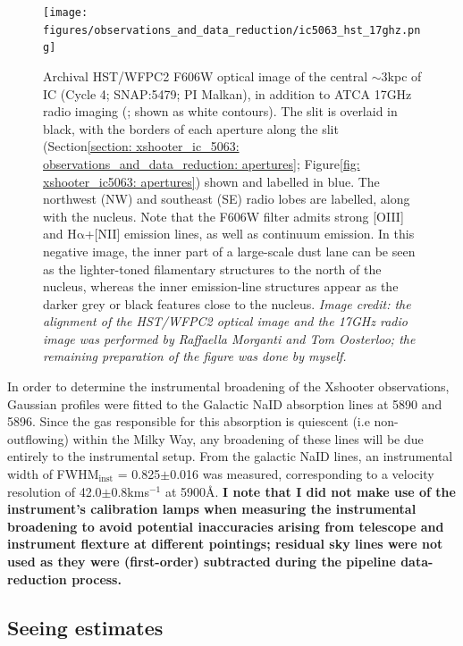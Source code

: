 \begin{figure}
    \texttt{[image: figures/observations\_and\_data\_reduction/ic5063\_hst\_17ghz.png]}
    \caption[VLT/Xshooter slit position used for the observations the Seyfert galaxy IC, overlaid on optical and 17\;GHz radio continuum imaging.]{Archival HST/WFPC2 F606W optical image of the central $\sim$3\;kpc of IC (Cycle 4; SNAP:5479; PI Malkan), in addition to ATCA 17\;GHz radio imaging (\citealt{Morganti2007}; shown as white contours). The slit is overlaid in black, with the borders of each aperture along the slit (Section\;\ref{section: xshooter_ic_5063: observations_and_data_reduction: apertures}; Figure\;\ref{fig: xshooter_ic5063: apertures}) shown and labelled in blue. The northwest (NW) and southeast (SE) radio lobes are labelled, along with the nucleus. Note that the F606W filter admits strong [OIII] and H$\mathrm{\alpha}$+[NII] emission lines, as well as continuum emission. In this negative image, the inner part of a large-scale dust lane can be seen as the lighter-toned filamentary structures to the north of the nucleus, whereas the inner emission-line structures appear as the darker grey or black features close to the nucleus. \textit{Image credit: the alignment of the HST/WFPC2 optical image and the 17\;GHz radio image was performed by Raffaella Morganti and Tom Oosterloo; the remaining preparation of the figure was done by myself.}}
    \label{fig: observations_and_data_reduction: xshooter_ic_5063: observations: ic5063_hst_17ghz}
\end{figure}

In order to determine the instrumental broadening of the Xshooter observations, Gaussian profiles were fitted to the Galactic NaID absorption lines at 5890\;{\AA} and 5896\;{\AA}. Since the gas responsible for this absorption is quiescent (i.e non-outflowing) within the Milky Way, any broadening of these lines will be due entirely to the instrumental setup. From the galactic NaID lines, an instrumental width of FWHM$_\mathrm{inst}$ = 0.825$\pm$0.016\;{\AA} was measured, corresponding to a velocity resolution of 42.0$\pm$0.8\;km\;s$^{-1}$ at 5900\;\AA. \textbf{I note that I did not make use of the instrument's calibration lamps when measuring the instrumental broadening to avoid potential inaccuracies arising from telescope and instrument flexture at different pointings; residual sky lines were not used as they were (first-order) subtracted during the pipeline data-reduction process.}

\subsection{Seeing estimates}
\label{section: xshooter_ic_5063: observations_and_data_reduction: seeing}

